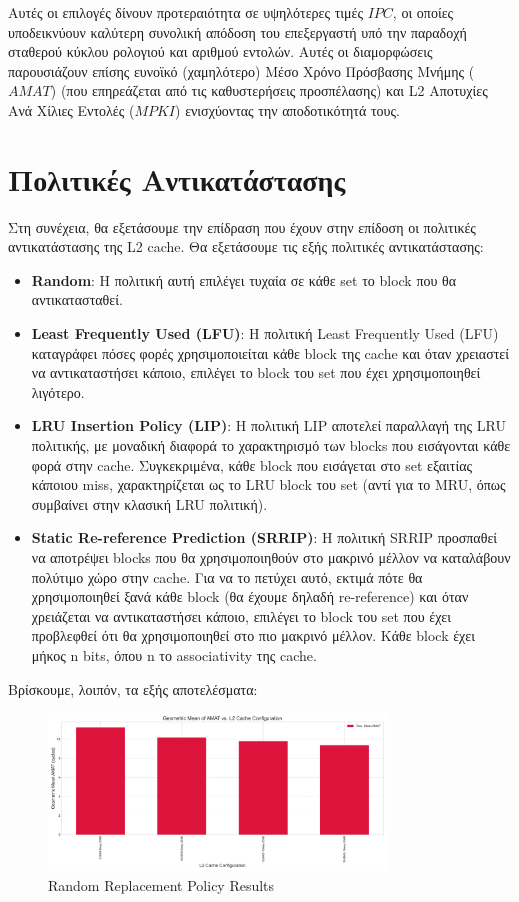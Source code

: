 \documentclass{article}
\begin{document}
Αυτές οι επιλογές δίνουν προτεραιότητα σε υψηλότερες τιμές $IPC$, οι οποίες υποδεικνύουν καλύτερη συνολική απόδοση του επεξεργαστή υπό την παραδοχή σταθερού κύκλου ρολογιού και αριθμού εντολών. 
Αυτές οι διαμορφώσεις παρουσιάζουν επίσης ευνοϊκό (χαμηλότερο) Μέσο Χρόνο Πρόσβασης Μνήμης ($AMAT$) (που επηρεάζεται από τις καθυστερήσεις προσπέλασης) και L2 Αποτυχίες Ανά Χίλιες Εντολές ($MPKI$) ενισχύοντας την αποδοτικότητά τους. 

\section{Πολιτικές Αντικατάστασης}
Στη συνέχεια, θα εξετάσουμε την επίδραση που έχουν στην επίδοση οι πολιτικές αντικατάστασης της L2 cache.
Θα εξετάσουμε τις εξής πολιτικές αντικατάστασης:
\begin{itemize}
    \item \textbf{Random}: Η πολιτική αυτή επιλέγει τυχαία σε κάθε set το block που θα αντικατασταθεί.
    \item \textbf{Least Frequently Used (LFU)}: Η πολιτική Least Frequently Used (LFU) καταγράφει πόσες φορές χρησιμοποιείται κάθε block της cache και όταν χρειαστεί να αντικαταστήσει κάποιο, επιλέγει το block του set που έχει χρησιμοποιηθεί λιγότερο.
    \item \textbf{LRU Insertion Policy (LIP)}: Η πολιτική LIP αποτελεί παραλλαγή της LRU πολιτικής, με μοναδική διαφορά το χαρακτηρισμό των blocks που εισάγονται κάθε φορά στην cache. Συγκεκριμένα, κάθε block που εισάγεται στο set εξαιτίας κάποιου miss, χαρακτηρίζεται ως το LRU block του set (αντί για το MRU, όπως συμβαίνει στην κλασική LRU πολιτική).
    \item \textbf{Static Re-reference Prediction (SRRIP)}: Η πολιτική SRRIP προσπαθεί να αποτρέψει blocks που θα χρησιμοποιηθούν στο μακρινό μέλλον να καταλάβουν πολύτιμο χώρο στην cache. Για να το πετύχει αυτό, εκτιμά πότε θα χρησιμοποιηθεί ξανά κάθε block (θα έχουμε δηλαδή re-reference) και όταν χρειάζεται να αντικαταστήσει κάποιο, επιλέγει το block του set που έχει προβλεφθεί ότι θα χρησιμοποιηθεί στο πιο μακρινό μέλλον. Κάθε block έχει μήκος n bits, όπου n το associativity της cache.
\end{itemize}

Βρίσκουμε, λοιπόν, τα εξής αποτελέσματα:

\begin{figure}[H]
    \centering
    \includegraphics[width=0.8\textwidth]{figures/random/amat_random.png}
    \caption{Random Replacement Policy Results}
    \label{fig:random_amat}
\end{figure}
\end{document}
